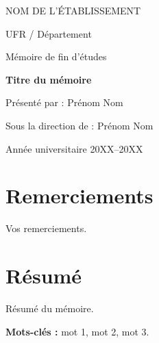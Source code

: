 \documentclass[12pt,a4paper]{report}
\begin{document}
\begin{titlepage}
  \centering
  {\large NOM DE L'ÉTABLISSEMENT\par}
  {\large UFR / Département\par}
  \vspace{3cm}
  {\Large Mémoire de fin d'études\par}
  \vspace{1cm}
  {\LARGE\bfseries Titre du mémoire\par}
  \vspace{2cm}
  {\large Présenté par : Prénom Nom\par}
  {\large Sous la direction de : Prénom Nom\par}
  \vfill
  {\large Année universitaire 20XX--20XX\par}
\end{titlepage}

\chapter*{Remerciements}
Vos remerciements.

\chapter*{Résumé}
Résumé du mémoire.

\noindent\textbf{Mots-clés :} mot 1, mot 2, mot 3.

\tableofcontents
\listoffigures
\listoftables







\end{document}
